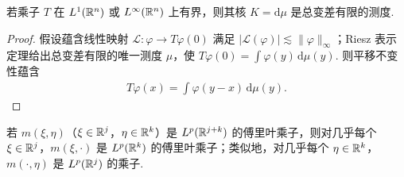 \begin{fact}\label{fact:4.3}
若乘子 $T$ 在 $L^1(\mathbb{R}^n)$ 或 $L^\infty(\mathbb{R}^n)$ 上有界，则其核 $K = \mathrm{d}\mu$ 是总变差有限的测度.
\end{fact}

\begin{proof}
假设蕴含线性映射 $\mathcal{L}\colon\varphi\to T\varphi(0)$ 满足 $|\mathcal{L}(\varphi)|\lesssim\|\varphi\|_\infty$；Riesz 表示定理给出总变差有限的唯一测度 $\mu$，使 $T\varphi(0)=\int\varphi(y)\,\mathrm{d}\mu(y)$. 则平移不变性蕴含
\begin{align*}
  T\varphi(x)=\int\varphi(y-x)\,\mathrm{d}\mu(y).
\end{align*}
\end{proof}

\begin{fact}[K. de Leew]\label{fact:4.4}
若 $m(\xi, \eta)$（$\xi \in \mathbb{R}^j$，$\eta \in \mathbb{R}^k$）是 $L^p(\mathbb{R}^{j+k})$ 的傅里叶乘子，则对几乎每个 $\xi \in \mathbb{R}^j$，$m(\xi, \cdot)$ 是 $L^p(\mathbb{R}^k)$ 的傅里叶乘子；类似地，对几乎每个 $\eta \in \mathbb{R}^k$，$m(\cdot, \eta)$ 是 $L^p(\mathbb{R}^j)$ 的乘子.
\end{fact}

